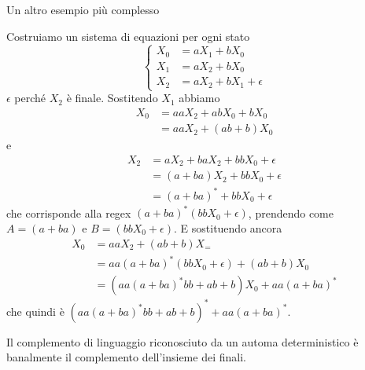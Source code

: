 \documentclass[12pt]{article}
\begin{document}
\begin{tcolorbox}
	Un altro esempio più complesso
	\begin{center}
	\end{center}
	Costruiamo un sistema di equazioni per ogni stato
	$$
	\begin{cases}
		X_0 &= a X_1 + b X_0 \\
		X_1 &= a X_2 + b X_0 \\
		X_2 &= a X_2 + b X_1 + \epsilon
	\end{cases}
	$$
	$\epsilon$ perché $X_2$ è finale.
	Sostitendo $X_1$ abbiamo
	\begin{align*}
		X_0 &= aa X_2 + ab X_0 + bX_0 \\
		    &= aaX_2 + (ab + b)X_0 
	\end{align*}
	e 
	\begin{align*}
		X_2 &= aX_2 + baX_2 + bbX_0 + \epsilon \\
		    &= (a + ba) X_2 + bbX_0 + \epsilon \\
		    &= (a + ba)^* + bb X_0 + \epsilon
	\end{align*}
	che corrisponde alla regex $(a + ba)^* (bb X_0 + \epsilon)$, prendendo come $A = (a + ba)$ e $B = (bb X_0 + \epsilon)$.
	E sostituendo ancora
	\begin{align*}
		X_0 &= aa X_2 + (ab + b) X_= \\
		    &= aa (a + ba)^*(bb X_0 + \epsilon) + (ab + b) X_0 \\ 
		    &= (aa (a + ba)^* bb + ab + b) X_0 + aa (a + ba)^*
	\end{align*}
	che quindi è $(aa (a + ba)^* bb + ab + b)^* + aa (a + ba)^*$.
\end{tcolorbox}

Il complemento di linguaggio riconosciuto da un automa deterministico è banalmente il complemento dell'insieme dei finali.
\end{document}
